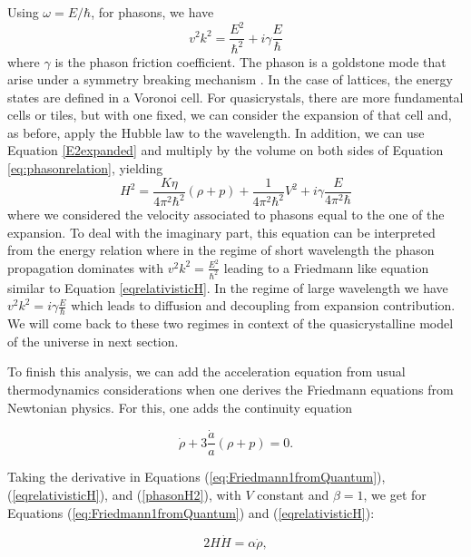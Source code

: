 \documentclass{article}
\begin{document}
Using $\omega = E / \hbar$, for phasons, we have 
\begin{equation}
v^{2}k^{2}=\frac{E^{2}}{\hbar^{2}}+i\gamma\frac{E}{\hbar}\label{eq:phasonrelation}
\end{equation}
where $\gamma$ is the phason friction coefficient. The phason is a
goldstone mode that arise under a symmetry breaking
mechanism \cite{Baggioli:2020haa}. In the case of lattices, the energy states are defined in a Voronoi cell. For quasicrystals, there are more fundamental cells or tiles, but with one fixed, we can consider the expansion of that cell and, as before, apply the Hubble law to the wavelength. In addition, we can use Equation \ref{E2expanded} and multiply by the volume on both sides of Equation \ref{eq:phasonrelation}, yielding
\begin{equation}
H^{2}=\frac{K\eta}{4\pi^{2}\hbar^{2}}(\rho+p)+\frac{1}{4\pi^{2}\hbar^{2}}V^{2}+i\gamma\frac{E}{4\pi^{2}\hbar} \label{phasonH2}
\end{equation}
where we considered the velocity associated to phasons equal to the one of the expansion. To deal with the imaginary part, this equation can be interpreted from the energy relation where in the regime of short wavelength the phason propagation dominates with $v^{2}k^{2}=\frac{E^{2}}{\hbar^{2}}$ leading to a Friedmann like equation similar to Equation \ref{eqrelativisticH}. In the regime of large wavelength we have $v^{2}k^{2}=i\gamma\frac{E}{\hbar}$ which leads to diffusion and decoupling from expansion contribution. We will come back to these two regimes in context of the quasicrystalline model of the universe in next section.



To finish this analysis, we can add the acceleration equation from usual thermodynamics considerations when one derives the Friedmann equations from Newtonian physics. For this, one adds the continuity equation

\begin{equation}
\dot{\rho} + 3 \frac{\dot{a}}{a} (\rho + p) = 0.
\end{equation}

Taking the derivative in Equations (\ref{eq:Friedmann1fromQuantum}), (\ref{eqrelativisticH}), and (\ref{phasonH2}), with $V$ constant and $\beta=1$, we get for Equations (\ref{eq:Friedmann1fromQuantum}) and (\ref{eqrelativisticH}):

\begin{equation}
2H \dot{H} = \alpha \dot{\rho},
\end{equation}
\end{document}
